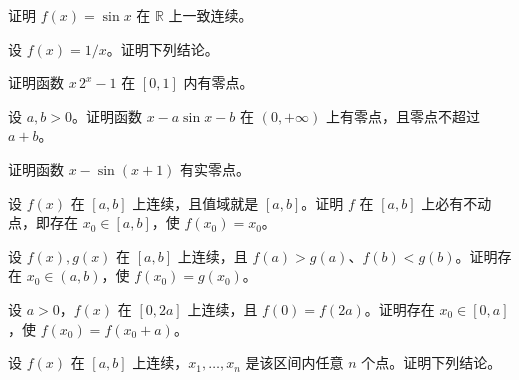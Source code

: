 \noindent\begin{minipage}{\textwidth}
证明 $f(x)=\sin x$ 在 $\mathbb R$ 上一致连续。
\end{minipage}\par\vfill
\newpage
\noindent\begin{minipage}{\textwidth}
设 $f(x)=1/x$。证明下列结论。
\SubQ{2}{任给 $0<a<1$，$f(x)$ 在 $[a,1)$ 上一致连续。}
\end{minipage}\par\vfill
\noindent\begin{minipage}{\textwidth}
证明函数 $x\,2^x-1$ 在 $[0,1]$ 内有零点。
\end{minipage}\par\vfill
\noindent\begin{minipage}{\textwidth}
设 $a,b>0$。证明函数 $x-a\sin x-b$ 在 $(0,+\infty)$ 上有零点，且零点不超过 $a+b$。
\end{minipage}\par\vfill
\noindent\begin{minipage}{\textwidth}
证明函数 $x-\sin(x+1)$ 有实零点。
\end{minipage}\par\vfill
\newpage
\noindent\begin{minipage}{\textwidth}
设 $f(x)$ 在 $[a,b]$ 上连续，且值域就是 $[a,b]$。证明 $f$ 在 $[a,b]$ 上必有不动点，即存在 $x_0\in[a,b]$，使 $f(x_0)=x_0$。
\end{minipage}\par\vfill
\noindent\begin{minipage}{\textwidth}
设 $f(x),g(x)$ 在 $[a,b]$ 上连续，且 $f(a)>g(a)$、$f(b)<g(b)$。证明存在 $x_0\in(a,b)$，使 $f(x_0)=g(x_0)$。
\end{minipage}\par\vfill
\noindent\begin{minipage}{\textwidth}
设 $a>0$，$f(x)$ 在 $[0,2a]$ 上连续，且 $f(0)=f(2a)$。证明存在 $x_0\in[0,a]$，使 $f(x_0)=f(x_0+a)$。
\end{minipage}\par\vfill
\noindent\begin{minipage}{\textwidth}
设 $f(x)$ 在 $[a,b]$ 上连续，$x_1,\ldots,x_n$ 是该区间内任意 $n$ 个点。证明下列结论。
\end{minipage}\par\vfill
